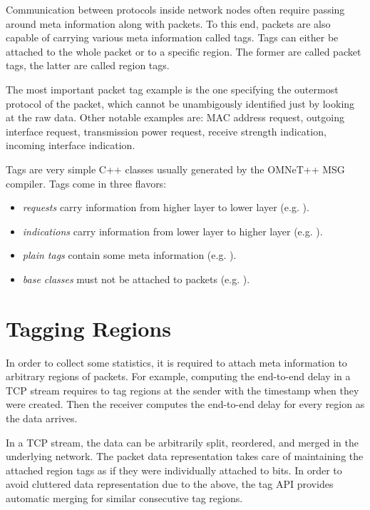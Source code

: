 Communication between protocols inside network nodes often require passing
around meta information along with packets. To this end, packets are also
capable of carrying various meta information called tags. Tags can either be
attached to the whole packet or to a specific region. The former are called
packet tags, the latter are called region tags.

The most important packet tag example is the one specifying the outermost
protocol of the packet, which cannot be unambigously identified just by looking
at the raw data. Other notable examples are: MAC address request, outgoing
interface request, transmission power request, receive strength indication,
incoming interface indication.


Tags are very simple C++ classes usually generated by the OMNeT++ MSG compiler.
Tags come in three flavors:

\begin{itemize}
	\item \textit{requests} carry information from higher layer to lower layer (e.g. ).
	\item \textit{indications} carry information from lower layer to higher layer (e.g. ).
	\item \textit{plain tags} contain some meta information (e.g. ).
	\item \textit{base classes} must not be attached to packets (e.g. ).
\end{itemize}


\section{Tagging Regions}

In order to collect some statistics, it is required to attach meta information
to arbitrary regions of packets. For example, computing the end-to-end delay in
a TCP stream requires to tag regions at the sender with the timestamp when they
were created. Then the receiver computes the end-to-end delay for every region
as the data arrives.


In a TCP stream, the data can be arbitrarily split, reordered, and merged in the
underlying network. The packet data representation takes care of maintaining the
attached region tags as if they were individually attached to bits. In order to
avoid cluttered data representation due to the above, the tag API provides
automatic merging for similar consecutive tag regions.


